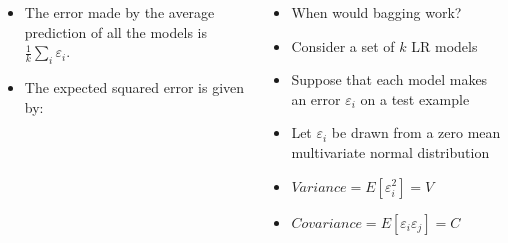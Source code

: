 \begin{frame}
	\begin{columns}
		\begin{overlayarea}{\textwidth}{\textheight}
			\begin{itemize}
				\justifying
				\item <7-> The error made by the average prediction of all the models is $\frac{1}{k}\sum_{i}\varepsilon_i$.
				\item <8-> The expected squared error is given by:
			\end{itemize}
		\end{overlayarea}
		\begin{overlayarea}{\textwidth}{\textheight}
			\begin{itemize}
				\justifying
				\item<1->  When would bagging work?
				\item<2-> Consider a set of $k$ LR models
				\item<3->  Suppose that each model makes an error $\varepsilon_i$ on a test example
				\item<4->  Let $\varepsilon_i$ be drawn from a zero mean multivariate normal distribution
				\item<5->  $ Variance = E[\varepsilon_i^{2}]=V$
				\item<6->  $Covariance = E[\varepsilon_i \varepsilon_j]=C$
			\end{itemize}
		\end{overlayarea}
	\end{columns}
\end{frame}


